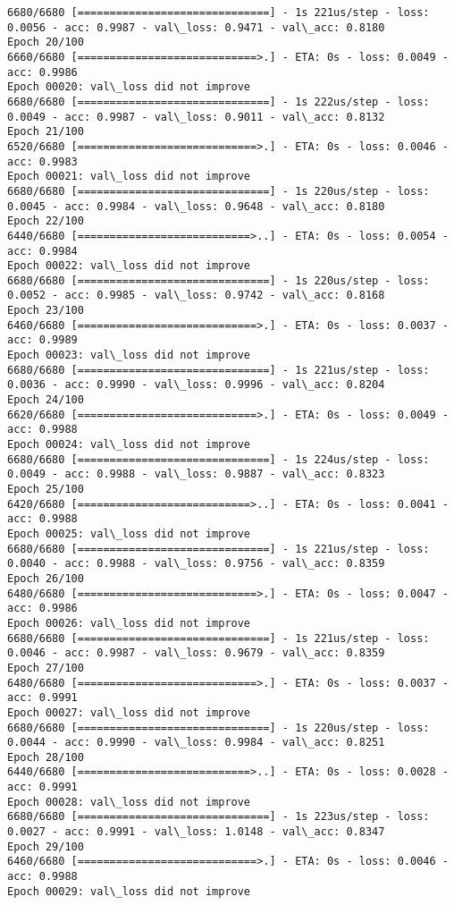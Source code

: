 \documentclass[11pt]{article}
\begin{document}
\begin{Verbatim}[commandchars=\\\{\}]
6680/6680 [==============================] - 1s 221us/step - loss: 0.0056 - acc: 0.9987 - val\_loss: 0.9471 - val\_acc: 0.8180
Epoch 20/100
6660/6680 [============================>.] - ETA: 0s - loss: 0.0049 - acc: 0.9986
Epoch 00020: val\_loss did not improve
6680/6680 [==============================] - 1s 222us/step - loss: 0.0049 - acc: 0.9987 - val\_loss: 0.9011 - val\_acc: 0.8132
Epoch 21/100
6520/6680 [============================>.] - ETA: 0s - loss: 0.0046 - acc: 0.9983
Epoch 00021: val\_loss did not improve
6680/6680 [==============================] - 1s 220us/step - loss: 0.0045 - acc: 0.9984 - val\_loss: 0.9648 - val\_acc: 0.8180
Epoch 22/100
6440/6680 [===========================>..] - ETA: 0s - loss: 0.0054 - acc: 0.9984
Epoch 00022: val\_loss did not improve
6680/6680 [==============================] - 1s 220us/step - loss: 0.0052 - acc: 0.9985 - val\_loss: 0.9742 - val\_acc: 0.8168
Epoch 23/100
6460/6680 [============================>.] - ETA: 0s - loss: 0.0037 - acc: 0.9989
Epoch 00023: val\_loss did not improve
6680/6680 [==============================] - 1s 221us/step - loss: 0.0036 - acc: 0.9990 - val\_loss: 0.9996 - val\_acc: 0.8204
Epoch 24/100
6620/6680 [============================>.] - ETA: 0s - loss: 0.0049 - acc: 0.9988
Epoch 00024: val\_loss did not improve
6680/6680 [==============================] - 1s 224us/step - loss: 0.0049 - acc: 0.9988 - val\_loss: 0.9887 - val\_acc: 0.8323
Epoch 25/100
6420/6680 [===========================>..] - ETA: 0s - loss: 0.0041 - acc: 0.9988
Epoch 00025: val\_loss did not improve
6680/6680 [==============================] - 1s 221us/step - loss: 0.0040 - acc: 0.9988 - val\_loss: 0.9756 - val\_acc: 0.8359
Epoch 26/100
6480/6680 [============================>.] - ETA: 0s - loss: 0.0047 - acc: 0.9986
Epoch 00026: val\_loss did not improve
6680/6680 [==============================] - 1s 221us/step - loss: 0.0046 - acc: 0.9987 - val\_loss: 0.9679 - val\_acc: 0.8359
Epoch 27/100
6480/6680 [============================>.] - ETA: 0s - loss: 0.0037 - acc: 0.9991
Epoch 00027: val\_loss did not improve
6680/6680 [==============================] - 1s 220us/step - loss: 0.0044 - acc: 0.9990 - val\_loss: 0.9984 - val\_acc: 0.8251
Epoch 28/100
6440/6680 [===========================>..] - ETA: 0s - loss: 0.0028 - acc: 0.9991
Epoch 00028: val\_loss did not improve
6680/6680 [==============================] - 1s 223us/step - loss: 0.0027 - acc: 0.9991 - val\_loss: 1.0148 - val\_acc: 0.8347
Epoch 29/100
6460/6680 [============================>.] - ETA: 0s - loss: 0.0046 - acc: 0.9988
Epoch 00029: val\_loss did not improve

\end{Verbatim}
\end{document}
